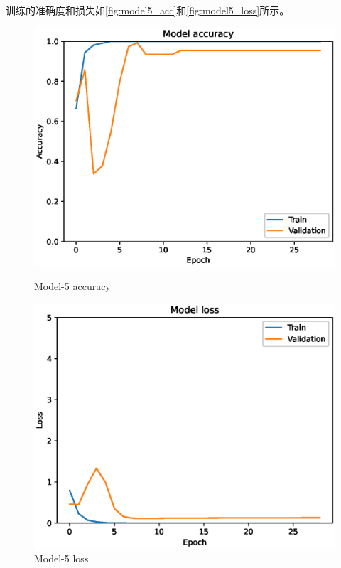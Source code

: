 训练的准确度和损失如\autoref{fig:model5_acc}和\autoref{fig:model5_loss}所示。
\begin{figure}[H]
    \centering
    \begin{minipage}{0.45\textwidth}
        \centering
        \includegraphics[width=\textwidth]{./fig/fish_lung/accuracy5.eps}
        \caption{Model-5 accuracy}
        \label{fig:model5_acc}
    \end{minipage}
    \begin{minipage}{0.45\textwidth}
        \centering
        \includegraphics[width=\textwidth]{./fig/fish_lung/loss5.eps}
        \caption{Model-5 loss}
        \label{fig:model5_loss}
    \end{minipage}
\end{figure}


